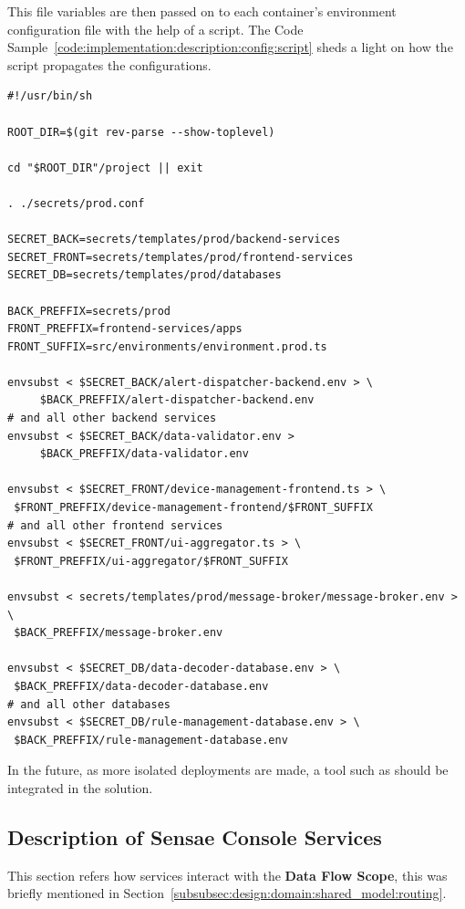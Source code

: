 This file variables are then passed on to each container's environment configuration file with the help of a script. The Code Sample~\ref{code:implementation:description:config:script} sheds a light on how the script propagates the configurations.

\begin{lstlisting}[caption=Configuration Propagation Script, label={code:implementation:description:config:script}]
#!/usr/bin/sh

ROOT_DIR=$(git rev-parse --show-toplevel)

cd "$ROOT_DIR"/project || exit

. ./secrets/prod.conf

SECRET_BACK=secrets/templates/prod/backend-services
SECRET_FRONT=secrets/templates/prod/frontend-services
SECRET_DB=secrets/templates/prod/databases

BACK_PREFFIX=secrets/prod
FRONT_PREFFIX=frontend-services/apps
FRONT_SUFFIX=src/environments/environment.prod.ts

envsubst < $SECRET_BACK/alert-dispatcher-backend.env > \
     $BACK_PREFFIX/alert-dispatcher-backend.env
# and all other backend services
envsubst < $SECRET_BACK/data-validator.env >
     $BACK_PREFFIX/data-validator.env

envsubst < $SECRET_FRONT/device-management-frontend.ts > \
 $FRONT_PREFFIX/device-management-frontend/$FRONT_SUFFIX
# and all other frontend services
envsubst < $SECRET_FRONT/ui-aggregator.ts > \
 $FRONT_PREFFIX/ui-aggregator/$FRONT_SUFFIX

envsubst < secrets/templates/prod/message-broker/message-broker.env > \
 $BACK_PREFFIX/message-broker.env

envsubst < $SECRET_DB/data-decoder-database.env > \
 $BACK_PREFFIX/data-decoder-database.env
# and all other databases
envsubst < $SECRET_DB/rule-management-database.env > \
 $BACK_PREFFIX/rule-management-database.env
\end{lstlisting}

In the future, as more isolated deployments are made, a tool such as  should be integrated in the solution.

\subsection{Description of Sensae Console Services}
\label{subsec:implementation:description:services}

This section refers how services interact with the \textbf{Data Flow Scope}, this was briefly mentioned in Section~\ref{subsubsec:design:domain:shared_model:routing}.

